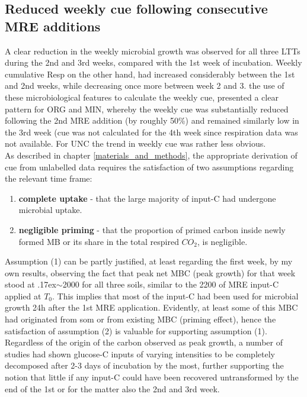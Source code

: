 	\subsection{Reduced weekly \gls{cue} following consecutive MRE additions}

	A clear reduction in the weekly microbial growth was observed for all three LTTs during the 2nd and 3rd weeks, compared with the 1st week of incubation.
	Weekly cumulative Resp on the other hand, had increased considerably between the 1st and 2nd weeks, while decreasing once more between week 2 and 3.
	the use of these microbiological features to calculate the weekly \gls{cue}, presented a clear pattern for ORG and MIN, whereby the weekly \gls{cue} was substantially reduced following the 2nd MRE addition (by roughly 50\%) and remained similarly low in the 3rd week (\gls{cue} was not calculated for the 4th week since respiration data was not available. For UNC the trend in weekly \gls{cue} was rather less obvious.\\
	As described in chapter \ref{materials_and_methods},  the appropriate derivation of \gls{cue} from unlabelled data requires the satisfaction of two assumptions regarding the relevant time frame:
	\begin{enumerate}
		\item \label{item: complete_uptake}\textbf{complete uptake} - that the large majority of input-C had undergone microbial uptake.
		\item \label{item: negligible_priming}\textbf{negligible priming} - that the proportion of primed carbon inside newly formed MB or its share in the total respired $ CO_2 $, is negligible.
	\end{enumerate}
	Assumption (1) can be partly justified, at least regarding the first week, by  my own results,  observing the fact that peak net MBC (peak growth) for that week stood at {\raise.17ex\hbox{$\scriptstyle\mathtt{\sim}$}}2000 \genericunit for all three soils, similar to the 2200 \genericunit of MRE input-C applied at $ T_0 $. This implies that most of the  input-C had been used for microbial growth 24h after the 1st MRE application. Evidently, at least some of this MBC had originated from \gls{som} or from existing MBC (priming effect), hence the satisfaction of assumption (2) is valuable for supporting assumption (1). Regardless of the origin of the carbon observed as peak growth, a  number of studies had shown glucose-C inputs of varying intensities to be completely decomposed after 2-3 days of incubation by the most\citep{hill2008, landi2006}, further supporting the notion that little if any input-C could have been recovered untransformed by the end of the 1st or for the matter also the 2nd and 3rd week.
